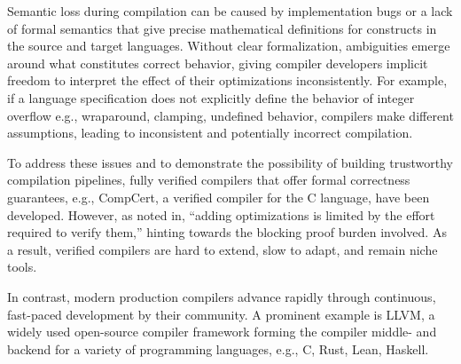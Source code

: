 \documentclass[review, anonymous, acmsmall, screen]{acmart}
\DeclareRobustCommand{\circled}[2][]{%
    \ifthenelse{\isempty{#1}}%
        {\circledbase{pairedOneLightBlue}{#2}}%
        {\autoref{#1}: \hyperref[#1]{\circledbase{pairedOneLightBlue}{#2}}}%
}
\begin{document}
Semantic loss during compilation can be caused by implementation bugs or a lack of formal semantics 
that give precise mathematical definitions for constructs in the source and target languages. 
Without clear formalization, ambiguities emerge around what constitutes correct behavior, giving 
compiler developers implicit freedom to interpret the effect of their optimizations inconsistently. 
For example, if a language specification does not explicitly define the behavior of integer overflow 
e.g., wraparound, clamping, undefined behavior, compilers make different assumptions, leading to inconsistent
and potentially incorrect compilation.

To address these issues and to demonstrate the possibility of building trustworthy compilation pipelines,
fully verified compilers that offer formal correctness guarantees, e.g., CompCert, 
a verified compiler for the C language, have been developed. However, as noted in, ``adding optimizations 
is limited by the effort required to verify them,'' hinting towards the blocking
proof burden involved. As a result, verified compilers are hard to extend, slow to adapt, and remain
niche tools.

In contrast, modern production compilers advance rapidly through continuous, fast-paced development 
by their community. A prominent example is LLVM, a widely used open-source compiler 
framework forming the compiler middle- and backend for a variety of programming languages, e.g., C, 
Rust, Lean, Haskell.
\end{document}
